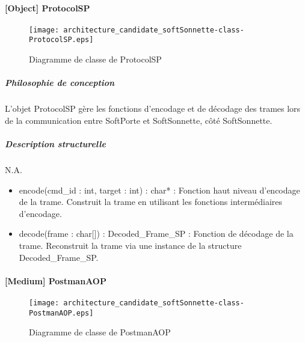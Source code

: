 \newpage

    \paragraph{[Object] ProtocolSP}

        \begin{figure} [H]
            \centering
            \texttt{[image: architecture\_candidate\_softSonnette-class-ProtocolSP.eps]}
            \caption{Diagramme de classe de ProtocolSP}
            \label{Classe-ProtocolSP}
        \end{figure}
    
                \subparagraph{Philosophie de conception}
    
                L'objet ProtocolSP gère les fonctions d'encodage et de décodage des trames lors de la communication entre SoftPorte et SoftSonnette, côté SoftSonnette.
    
                \subparagraph{Description structurelle}
    
                N.A. 
    
                \begin{itemize}
                    \item {encode(cmd\_id : int, target : int) : char* : Fonction haut niveau d'encodage de la trame. Construit la trame en utilisant les fonctions intermédiaires d'encodage.}
                    \item {decode(frame : char[]) : Decoded\_Frame\_SP : Fonction de décodage de la trame. Reconstruit la trame via une instance de la structure Decoded\_Frame\_SP.} 
                \end{itemize} 

\newpage

    \paragraph{[Medium] PostmanAOP}

        \begin{figure} [H]
            \centering
            \texttt{[image: architecture\_candidate\_softSonnette-class-PostmanAOP.eps]}
            \caption{Diagramme de classe de PostmanAOP}
            \label{Classe-PostmanAOP}
        \end{figure}
    
